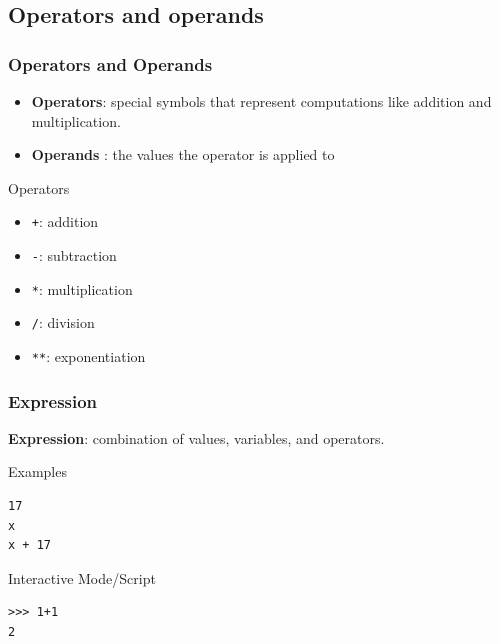 \documentclass{beamer}
\begin{document}
\subsection{Operators and operands}
\begin{frame}[fragile]
\frametitle{Operators and Operands}
\begin{itemize}
\item \textbf{Operators}: special symbols that represent computations like
addition and multiplication.  
\item \textbf{Operands} : the values the operator is applied to
\end{itemize}
\begin{block}{Operators}
\begin{itemize} 
\item \texttt{+}: addition
\item \texttt{-}: subtraction
\item  \texttt{*}: multiplication
\item \texttt{/}: division
\item \texttt{**}: exponentiation
\end{itemize}
\end{block}
\end{frame}
\begin{frame}[fragile]
\frametitle{Expression}

\textbf{Expression}: combination of values, variables, and operators.
\begin{block}{Examples}
\begin{verbatim}
17
x
x + 17
\end{verbatim}
\end{block}
\begin{block}{Interactive Mode/Script}
\begin{verbatim}
>>> 1+1
2
\end{verbatim}
\end{block}
\end{frame}
\end{document}
